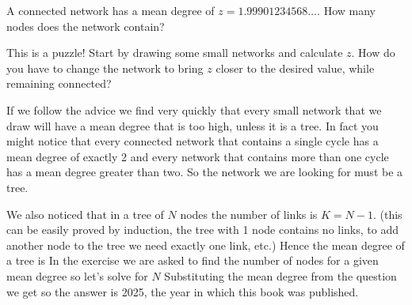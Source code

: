 
A connected network has a mean degree of 
$z=1.99901234568\ldots$. How many nodes does the network contain?

This is a puzzle! Start by drawing some small networks and calculate $z$. How do you have to change the network to bring $z$ closer to the desired value, while remaining connected?

\solution
If we follow the advice we find very quickly that every small network that we draw will have a mean degree that is too high, unless it is a tree. In fact you might notice that every connected network that contains a single cycle has a mean degree of exactly 2 and every network that contains more than one cycle has a mean degree greater than two. So the network we are looking for must be a tree. 

We also noticed that in a tree of $N$ nodes the number of links is $K=N-1$. 
(this can be easily proved by induction, the tree with 1 node contains no links, to add another node to the tree we need exactly one link, etc.)
Hence the mean degree of a tree is 
In the exercise we are asked to find the number of nodes for a given mean degree so let's solve for $N$
Substituting the mean degree from the question we get
so the answer is 2025, the year in which this book was published.  

\solutionend
